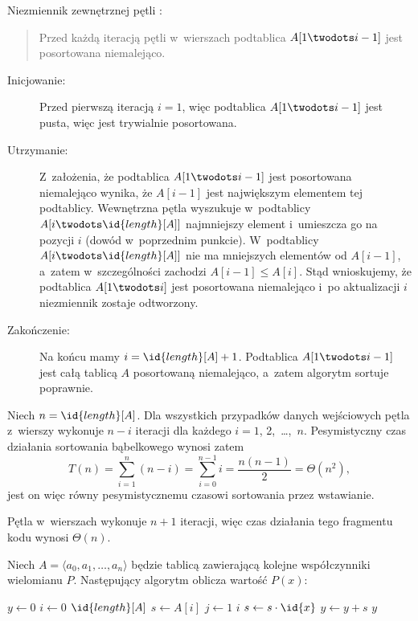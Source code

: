 \subproblem %
Niezmiennik zewnętrznej pętli :
\begin{quote}
Przed każdą iteracją pętli  w~wierszach  podtablica $A[1\twodots i-1]$ jest posortowana niemalejąco.
\end{quote}
\begin{description}
	\item[Inicjowanie:] Przed pierwszą iteracją $i=1$, więc podtablica $A[1\twodots i-1]$ jest pusta, więc jest trywialnie posortowana.
	\item[Utrzymanie:] Z~założenia, że podtablica $A[1\twodots i-1]$ jest posortowana niemalejąco wynika, że $A[i-1]$ jest największym elementem tej podtablicy. Wewnętrzna pętla  wyszukuje w~podtablicy $A[i\twodots\id{length}[A]]$ najmniejszy element i~umieszcza go na pozycji $i$ (dowód w~poprzednim punkcie). W~podtablicy $A[i\twodots\id{length}[A]]$ nie ma mniejszych elementów od $A[i-1]$, a~zatem w~szczególności zachodzi $A[i-1]\le A[i]$. Stąd wnioskujemy, że podtablica $A[1\twodots i]$ jest posortowana niemalejąco i~po aktualizacji $i$ niezmiennik zostaje odtworzony.
	\item[Zakończenie:] Na końcu mamy $i=\id{length}[A]+1$. Podtablica $A[1\twodots i-1]$ jest całą tablicą $A$ posortowaną niemalejąco, a~zatem algorytm sortuje poprawnie.
\end{description}

\subproblem %
Niech $n=\id{length}[A]$. Dla wszystkich przypadków danych wejściowych pętla  z~wierszy  wykonuje $n-i$ iteracji dla każdego $i=1$, 2,~\dots,~$n$. Pesymistyczny czas działania sortowania bąbelkowego wynosi zatem
\[
	T(n) = \sum_{i=1}^n(n-i) = \sum_{i=0}^{n-1}i = \frac{n(n-1)}{2} = \Theta(n^2),
\]
jest on więc równy pesymistycznemu czasowi sortowania przez wstawianie.


\subproblem %
Pętla  w~wierszach  wykonuje $n+1$ iteracji, więc czas działania tego fragmentu kodu wynosi $\Theta(n)$.

\subproblem %
Niech $A=\langle a_0,a_1,\dots,a_n\rangle$ będzie tablicą zawierającą kolejne współczynniki wielomianu $P$. Następujący algorytm oblicza wartość $P(x)$:
\begin{codebox}
\li	$y\gets0$
\li	\For $i\gets0$ \To $\id{length}[A]$
\li		\Do
			$s\gets A[i]$
\li			\For $j\gets1$ \To $i$ \label{li:naive-polynomial-evaluation-for-begin}
\li				\Do $s\gets s\cdot\id{x}$
				\End \label{li:naive-polynomial-evaluation-for-end}
\li			$y\gets y+s$
		\End
\li	\Return $y$
\end{codebox}

